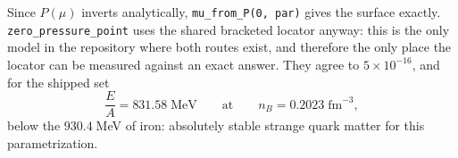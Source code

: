 \documentclass[aps,prc,onecolumn,superscriptaddress,nofootinbib,10pt]{revtex4-2}
\begin{document}
Since $P(\mu)$ inverts analytically, \texttt{mu\_from\_P(0, par)} gives the
surface exactly. \texttt{zero\_pressure\_point} uses the shared bracketed
locator anyway: this is the only model in the repository where both routes
exist, and therefore the only place the locator can be measured against an
exact answer. They agree to $5\times10^{-16}$, and for the shipped set
%
\begin{equation}
  \frac{E}{A} = 831.58\;\mathrm{MeV}
  \qquad\text{at}\qquad n_B = 0.2023\;\mathrm{fm}^{-3},
\end{equation}
%
below the $930.4\;$MeV of iron: absolutely stable strange quark matter for this
parametrization.



\end{document}
